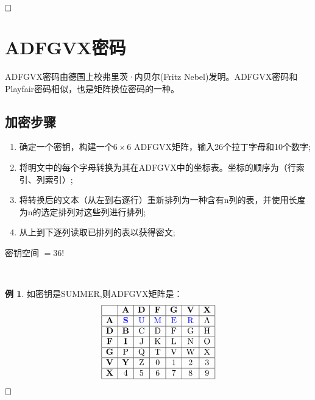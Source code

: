 \documentclass{article}
\theoremstyle{definition}
\newtheorem{example}{\indent 例}
\begin{document}
$\hfill\square$ 

\section{ADFGVX密码}
ADFGVX密码由德国上校弗里茨·内贝尔(Fritz Nebel)发明。ADFGVX密码和Playfair密码相似，也是矩阵换位密码的一种。

\subsection{加密步骤}
\begin{enumerate}
\item 确定一个密钥，构建一个$6 \times 6$ ADFGVX矩阵，输入26个拉丁字母和10个数字;
\item 将明文中的每个字母转换为其在ADFGVX中的坐标表。坐标的顺序为（行索引、列索引）;
\item 将转换后的文本（从左到右逐行）重新排列为一种含有n列的表，并使用长度为n的选定排列对这些列进行排列;
\item 从上到下逐列读取已排列的表以获得密文;
\end{enumerate}

密钥空间 $=36!$

~\\

\begin{example}

如密钥是SUMMER,则ADFGVX矩阵是：
$$
\begin{array}{|c|c|c|c|c|c|c|}
\hline & \mathbf{A} & \mathbf{D} & \mathbf{F} & \mathbf{G} & \mathbf{V} & \mathbf{X} \\
\hline \mathbf{A} &{\color{blue}\mathbf{S}} & {\color{blue}\mathrm{U}} & {\color{blue}\mathrm{M}} & {\color{blue}\mathrm{E}} & {\color{blue}\mathrm{R}} & \mathrm{A} \\
\hline \mathbf{D} &\mathbf{B} & \mathrm{C} & \mathrm{D} & \mathrm{F} & \mathrm{G} & \mathrm{H} \\
\hline \mathbf{F}&\mathbf{I} &  \mathrm{J} & \mathrm{K} & \mathrm{L} & \mathrm{N} & \mathrm{O} \\
\hline \mathbf{G}&\mathrm{P} & \mathrm{Q} & \mathrm{T} & \mathrm{V} & \mathrm{W}& \mathrm{X}  \\
\hline \mathbf{V}&\mathbf{Y} & \mathrm{Z} & 0& \mathrm{1} & \mathrm{2} & \mathrm{3} \\
\hline \mathbf{X}&\mathrm{4} & \mathrm{5} & \mathrm{6} & 7 & \mathrm{8} & 9 \\
\hline
\end{array}\\
$$

\end{example}
$\hfill\square$ 
\end{document}
